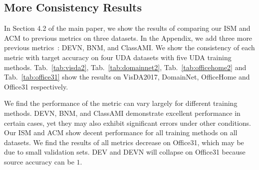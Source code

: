 \subsection{More Consistency Results}

In Section 4.2 of the main paper, we show the results of comparing our ISM and ACM to previous metrics on three datasets. In the Appendix, we add three more previous metrics~\cite{ThreeNV}: DEVN, BNM, and ClassAMI. We show the consistency of each metric with target accuracy on four UDA datasets with five UDA training methods. Tab.~\ref{tab:visda2}, Tab.~\ref{tab:domainnet2}, Tab.~\ref{tab:officehome2} and Tab.~\ref{tab:office31} show the results on VisDA2017, DomainNet, OfficeHome and Office31 respectively.

We find the performance of the metric can vary largely for different training methods. DEVN, BNM, and ClassAMI demonstrate excellent performance in certain cases, yet they may also exhibit significant errors under other conditions. Our ISM and ACM show decent performance for all training methods on all datasets. We find the results of all metrics decrease on Office31, which may be due to small validation sets. DEV and DEVN will collapse on Office31 because source accuracy can be $1$.

